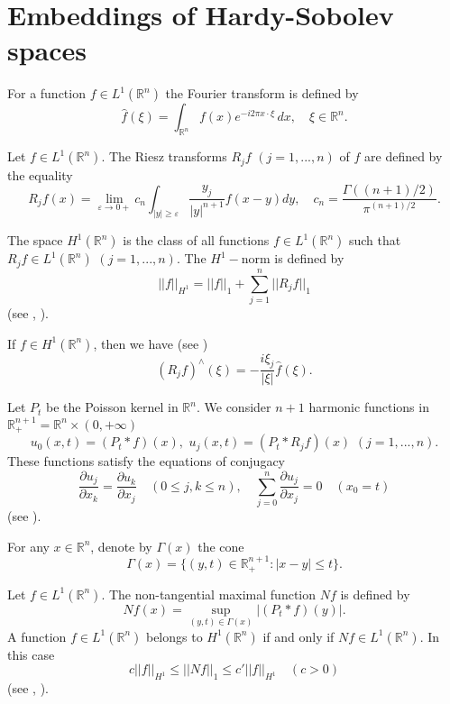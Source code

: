 \documentclass[12pt,twoside,reqno]{amsart}
\numberwithin{equation}{section}
\theoremstyle{definition}
\numberwithin{equation}{section}
\def\R{\mathbb{R}}
\def\e{\varepsilon}
\begin{document}
\section{ Embeddings of  Hardy-Sobolev spaces}

\vskip 6pt

For a function $f\in L^1(\R^n)$ the Fourier transform
is defined by
$$
\widehat{f}(\xi)=\int_{\R^n}f(x)e^{-i2\pi x\cdot \xi}\,dx, \quad
\xi\in \R^n.
$$

Let $f\in L^1(\R^n).$ The Riesz transforms $R_jf\,\, (j=1,...,n)$ of $f$ are defined by the equality
$$
R_jf(x)=\lim_{\e\to 0+} c_n\int_{|y|\ge \e} \frac{y_j}{|y|^{n+1}}f(x-y)dy,\quad  c_n=\frac{\Gamma((n+1)/2)}{\pi^{(n+1)/2}}.
$$



The space $H^1(\R^n)$ is  the class of all functions $f\in L^1(\R^n)$ such that $R_jf\in L^1(\R^n)$ $(j=1,...,n)$.
The $H^1-$norm is defined by
$$
||f||_{H^1}=||f||_1+\sum_{j=1}^n||R_jf||_1
$$
(see \cite[p. 144]{FS}, \cite[Ch. III.4]{GR}).

If $f\in H^1(\R^n)$, then we have  (see \cite[p. 197]{GR})
$$
(R_jf)^\land(\xi)=-\frac{i\xi_j}{|\xi|}\widehat f(\xi).
$$

Let $P_t$ be the Poisson kernel in $\R^n$. We consider $n+1$ harmonic functions in $\R^{n+1}_+=\R^n\times (0,+\infty)$
\begin{equation}\label{harm1}
u_0(x,t)=(P_t\ast f)(x), \,\, u_j(x,t)=(P_t\ast R_jf)(x) \,\,(j=1,...,n).
\end{equation}
These functions satisfy the equations of conjugacy
\begin{equation}\label{conj}
\frac{\partial u_j}{\partial x_k}=\frac{\partial u_k}{\partial x_j}\quad(0\le j,k\le n), \quad
\sum_{j=0}^n\frac{\partial u_j}{\partial x_j}=0 \quad (x_0=t)
\end{equation}
(see \cite[Ch. III.4]{GR}).

For any $x\in \R^n$, denote by $\Gamma(x)$ the cone
$$
\Gamma(x)=\{(y,t)\in \R^{n+1}_+: |x-y|\le t\}.
$$


Let $f\in L^1(\R^n)$. The non-tangential maximal function $Nf$ is defined by
$$
Nf(x)=\sup_{(y,t)\in \Gamma(x)} |(P_t\ast f)(y)|.
$$
A function $f\in L^1(\R^n)$ belongs to $H^1(\R^n)$ if and only if $Nf\in L^1(\R^n)$.
In this case
\begin{equation}\label{max}
c||f||_{H^1}\le ||Nf||_1\le c'||f||_{H^1}\quad (c>0)
\end{equation}
(see \cite[Ch. III.4]{GR}, \cite[Th. 6.7.4]{Graf}).
\end{document}
